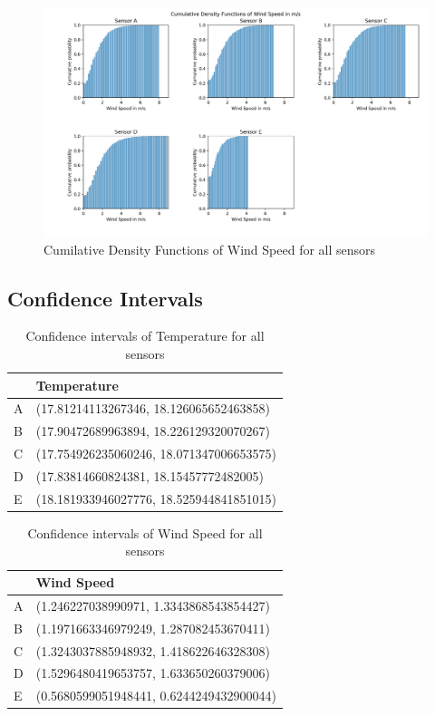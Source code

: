 \documentclass{article}
\begin{document}
        \begin{figure}[H]
            \includegraphics[width=\textwidth]{cdf_windspeed}
            \caption{Cumilative Density Functions of Wind Speed for all sensors}
        \end{figure}

    \subsection{Confidence Intervals}
        \begin{table}[H]
            \caption {Confidence intervals of Temperature for all sensors}
            \begin{tabular}{ll}
            & Temperature                              \\ \hline
            A & (17.81214113267346, 18.126065652463858)  \\
            B & (17.90472689963894, 18.226129320070267)  \\
            C & (17.754926235060246, 18.071347006653575) \\
            D & (17.83814660824381, 18.15457772482005)   \\
            E & (18.181933946027776, 18.525944841851015)
            \end{tabular}
            \end{table}

        \begin{table}[H]
            \caption {Confidence intervals of Wind Speed for all sensors}
            \begin{tabular}{ll}
            & Wind Speed                               \\ \hline
            A & (1.246227038990971, 1.3343868543854427)  \\
            B & (1.1971663346979249, 1.287082453670411)  \\
            C & (1.3243037885948932, 1.418622646328308)  \\
            D & (1.5296480419653757, 1.633650260379006)  \\
            E & (0.5680599051948441, 0.6244249432900044)
            \end{tabular}
            \end{table}
\end{document}
